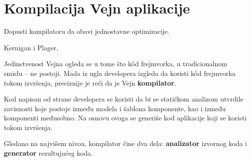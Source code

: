 \chapter{Kompilacija Vejn aplikacije}
\label{ch:kompilacija-vejn-aplikacije}

\epigraph{
  Dopusti kompilatoru da obavi jednostavne optimizacije.
}{Kernigan i Plager, }

Jedinstvenost Vejna ogleda se u tome što kôd frejmvorka, u tradicionalnom smislu -- ne postoji.
Mada iz ugla developera izgleda da koristi kôd frejmvorka tokom izvršenja, preciznije je reći da je Vejn \textbf{kompilator}.

Kod napisan od strane developera se koristi da bi se statičkom analizom utvrdile zavisnosti koje postoje između modela i šablona komponente, kao i između komponenti međusobno.
Na osnovu ovoga se generiše kod aplikacije koji se koristi tokom izvršenja.

Gledano na najvišem nivou, kompilator čine dva dela: \textbf{analizator} izvornog koda i \textbf{generator} rezultujućeg koda.








